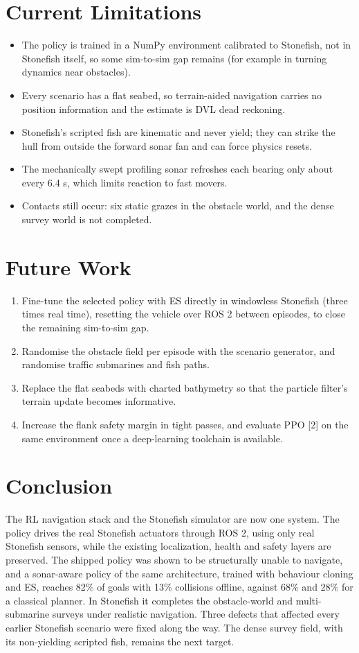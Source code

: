\documentclass[conference]{IEEEtran}
\begin{document}
\section{Current Limitations}
\begin{itemize}\item The policy is trained in a NumPy environment calibrated to Stonefish, not in Stonefish itself, so some sim-to-sim gap remains (for example in turning dynamics near obstacles).\item Every scenario has a flat seabed, so terrain-aided navigation carries no position information and the estimate is DVL dead reckoning.\item Stonefish's scripted fish are kinematic and never yield; they can strike the hull from outside the forward sonar fan and can force physics resets.\item The mechanically swept profiling sonar refreshes each bearing only about every 6.4 s, which limits reaction to fast movers.\item Contacts still occur: six static grazes in the obstacle world, and the dense survey world is not completed.\end{itemize}
\section{Future Work}
\begin{enumerate}\item Fine-tune the selected policy with ES directly in windowless Stonefish (three times real time), resetting the vehicle over ROS 2 between episodes, to close the remaining sim-to-sim gap.\item Randomise the obstacle field per episode with the scenario generator, and randomise traffic submarines and fish paths.\item Replace the flat seabeds with charted bathymetry so that the particle filter's terrain update becomes informative.\item Increase the flank safety margin in tight passes, and evaluate PPO [2] on the same environment once a deep-learning toolchain is available.\end{enumerate}
\section{Conclusion}
The RL navigation stack and the Stonefish simulator are now one system. The policy drives the real Stonefish actuators through ROS 2, using only real Stonefish sensors, while the existing localization, health and safety layers are preserved. The shipped policy was shown to be structurally unable to navigate, and a sonar-aware policy of the same architecture, trained with behaviour cloning and ES, reaches 82\% of goals with 13\% collisions offline, against 68\% and 28\% for a classical planner. In Stonefish it completes the obstacle-world and multi-submarine surveys under realistic navigation. Three defects that affected every earlier Stonefish scenario were fixed along the way. The dense survey field, with its non-yielding scripted fish, remains the next target.
\end{document}
